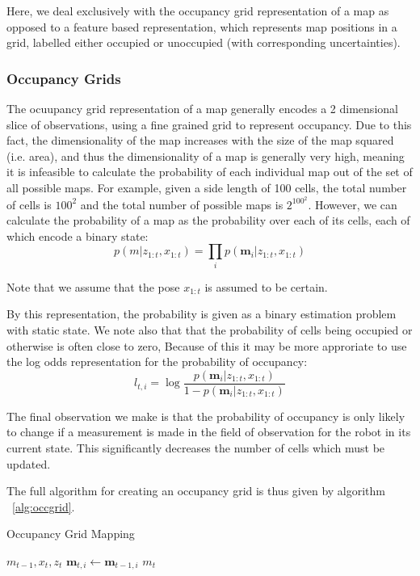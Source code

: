 \documentclass[english]{article}
\begin{document}
Here, we deal exclusively with the occupancy grid representation of a map as opposed to a feature based representation, which represents map positions in a grid, labelled either occupied or unoccupied (with corresponding uncertainties). 

\subsubsection{Occupancy Grids}
The ocuupancy grid representation of a map generally encodes a 2 dimensional slice of observations, using a fine grained grid to represent occupancy. Due to this fact, the dimensionality of the map increases with the size of the map squared (i.e. area), and thus the dimensionality of a map is generally very high, meaning it is infeasible to calculate the probability of each individual map out of the set of all possible maps. For example, given a side length of 100 cells, the total number of cells is $100^2$ and the total number of possible maps is $2^{100^2}$. However, we can calculate the probability of a map as the probability over each of its cells, each of which encode a binary state:
\begin{equation}
p\left(m | z_{1:t}, x_{1:t}\right) = \prod_i p\left(\textbf{m}_i | z_{1:t}, x_{1:t}\right)
\end{equation}

Note that we assume that the pose $x_{1:t}$ is assumed to be certain. 

By this representation, the probability is given as a binary estimation problem with static state. We note also that that the probability of cells being occupied or otherwise is often close to zero, Because of this it may be more approriate to use the log odds representation for the probability of occupancy:
\begin{equation}
l_{t,i} = \log{\frac{p(\textbf{m}_i | z_{1:t}, x_{1:t})}{1-p(\textbf{m}_i | z_{1:t}, x_{1:t})}}
\end{equation}

The final observation we make is that the probability of occupancy is only likely to change if a measurement is made in the field of observation for the robot in its current state. This significantly decreases the number of cells which must be updated.

The full algorithm for creating an occupancy grid is thus given by algorithm ~\ref{alg:occgrid}.

\begin{algorithm}
\caption{Occupancy Grid Mapping}
\label{alg:occgrid}
\begin{algorithmic}
	\REQUIRE $m_{t-1}, x_t, z_t$
	\ELSE
	\STATE $\textbf{m}_{t, i} \leftarrow \textbf{m}_{t-1, i}$
	\ENDIF
	\ENDFOR
	\RETURN $m_t$
\end{algorithmic}
\end{algorithm}
\end{document}
